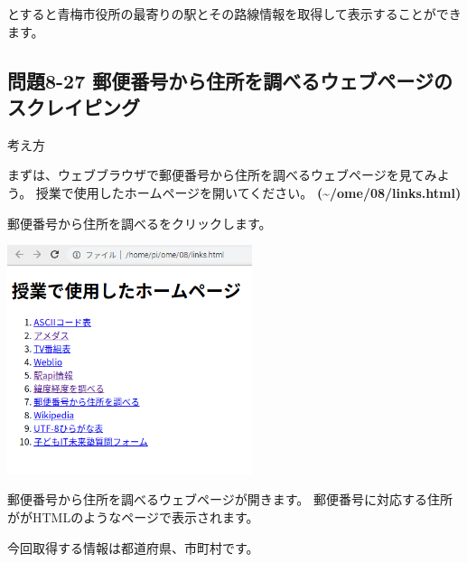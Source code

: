 \documentclass[a4paper,12pt,dvipdfmx]{jarticle}
\begin{document}
\bigskip


\bigskip

とすると青梅市役所の最寄りの駅とその路線情報を取得して表示することができます。


\bigskip

\clearpage\subsection*{問題8-27
郵便番号から住所を調べるウェブページのスクレイピング}
考え方

まずは、ウェブブラウザで郵便番号から住所を調べるウェブページを見てみよう。
授業で使用したホームページを開いてください。
\textbf{(\~{}/ome/08/links.html)}

郵便番号から住所を調べるをクリックします。




\begin{center}
\includegraphics[width=7.181cm,height=6.712cm]{textbook-img017.png}

\end{center}

\bigskip


\bigskip

郵便番号から住所を調べるウェブページが開きます。
郵便番号に対応する住所ががHTMLのようなページで表示されます。

今回取得する情報は都道府県、市町村です。
\end{document}
